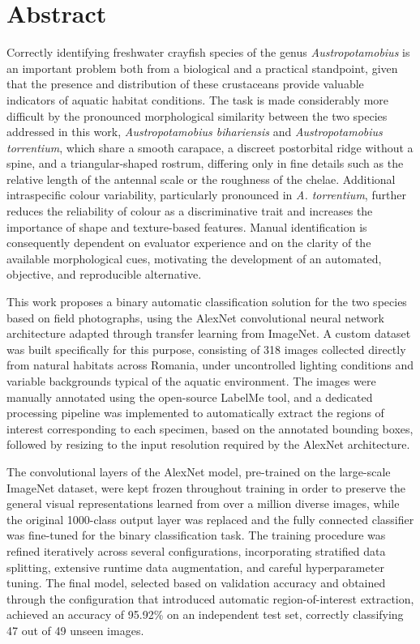 \documentclass[12pt,a4paper]{report}
\theoremstyle{definition}
\theoremstyle{remark}
\begin{document}
\section*{Abstract}

Correctly identifying freshwater crayfish species of the genus \textit{Austropotamobius} is an important problem both from a biological and a practical standpoint, given that the presence and distribution of these crustaceans provide valuable indicators of aquatic habitat conditions. The task is made considerably more difficult by the pronounced morphological similarity between the two species addressed in this work, \textit{Austropotamobius bihariensis} and \textit{Austropotamobius torrentium}, which share a smooth carapace, a discreet postorbital ridge without a spine, and a triangular-shaped rostrum, differing only in fine details such as the relative length of the antennal scale or the roughness of the chelae. Additional intraspecific colour variability, particularly pronounced in \textit{A. torrentium}, further reduces the reliability of colour as a discriminative trait and increases the importance of shape and texture-based features. Manual identification is consequently dependent on evaluator experience and on the clarity of the available morphological cues, motivating the development of an automated, objective, and reproducible alternative.

This work proposes a binary automatic classification solution for the two species based on field photographs, using the AlexNet convolutional neural network architecture adapted through transfer learning from ImageNet. A custom dataset was built specifically for this purpose, consisting of 318 images collected directly from natural habitats across Romania, under uncontrolled lighting conditions and variable backgrounds typical of the aquatic environment. The images were manually annotated using the open-source LabelMe tool, and a dedicated processing pipeline was implemented to automatically extract the regions of interest corresponding to each specimen, based on the annotated bounding boxes, followed by resizing to the input resolution required by the AlexNet architecture.

The convolutional layers of the AlexNet model, pre-trained on the large-scale ImageNet dataset, were kept frozen throughout training in order to preserve the general visual representations learned from over a million diverse images, while the original 1000-class output layer was replaced and the fully connected classifier was fine-tuned for the binary classification task. The training procedure was refined iteratively across several configurations, incorporating stratified data splitting, extensive runtime data augmentation, and careful hyperparameter tuning. The final model, selected based on validation accuracy and obtained through the configuration that introduced automatic region-of-interest extraction, achieved an accuracy of 95.92\% on an independent test set, correctly classifying 47 out of 49 unseen images.
\end{document}

